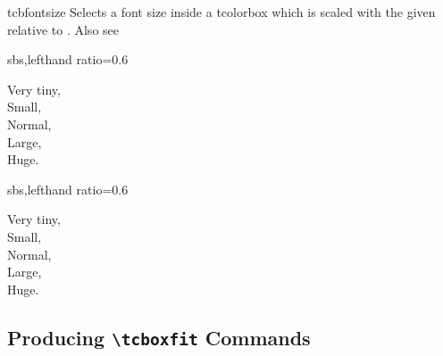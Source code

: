 \begin{docCommand}{tcbfontsize}{}
  Selects a font size inside a tcolorbox which is scaled with the given
   relative to .
  Also see 

\begin{dispExample*}{sbs,lefthand ratio=0.6}
\begin{tcolorbox}[fit basedim=10pt]
  { Very tiny,}\\
  { Small,}\\
  { Normal,}\\
  { Large,}\\
  { Huge.}
\end{tcolorbox}
\end{dispExample*}
\begin{dispExample*}{sbs,lefthand ratio=0.6}
\begin{tcolorbox}[fit basedim=10pt,
    fit to height=2cm]
  { Very tiny,}\\
  { Small,}\\
  { Normal,}\\
  { Large,}\\
  { Huge.}
\end{tcolorbox}
\end{dispExample*}
\end{docCommand}


\clearpage
\subsection{Producing \texttt{\textbackslash tcboxfit} Commands}\label{subsec:fitting_new}


